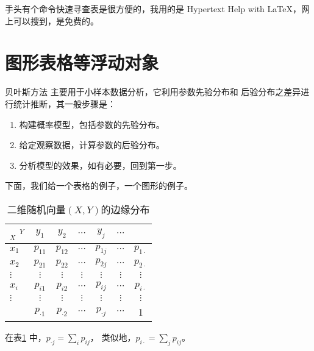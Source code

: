 \documentclass[12pt,a4paper]{article}
\begin{document}
手头有个命令快速寻查表是很方便的，我用的是 Hypertext Help with \LaTeX，网上可以搜到，是免费的。

\section{图形表格等浮动对象}

贝叶斯方法\cite{Gelman} 主要用于小样本数据分析，它利用参数先验分布和
后验分布之差异进行统计推断，其一般步骤是：

\begin{enumerate}
 \item 构建概率模型，包括参数的先验分布。
 \item 给定观察数据，计算参数的后验分布。
 \item 分析模型的效果，如有必要，回到第一步。
\end{enumerate}

\begin{example}
下面，我们给一个表格的例子，一个图形的例子。

\begin{center}
\begin{table}[!ht]     %
\centering
\caption{二维随机向量$(X,Y)$的边缘分布}
\begin{tabular}{l|ccccc|c}
  $_X$\hspace{3mm} $^Y$&$y_1$&$y_2$&$\cdots$&$y_j$&$\cdots$\\
\hline
$x_1$   &$p_{11}$&$p_{12}$&$\cdots$&$p_{1j}$&$\cdots$&$p_{1\cdot}$\\
$x_2$   &$p_{21}$&$p_{22}$&$\cdots$&$p_{2j}$&$\cdots$&$p_{2\cdot}$\\
$\vdots$&$\vdots$&$\vdots$&$\vdots$&$\vdots$&$\vdots$&$\vdots$\\
$x_i$   &$p_{i1}$&$p_{i2}$&$\cdots$&$p_{ij}$&$\cdots$&$p_{i\cdot}$\\
$\vdots$&$\vdots$&$\vdots$&$\vdots$&$\vdots$&$\vdots$&$\vdots$\\
\hline
   &$p_{\cdot 1}$&$p_{\cdot 2}$&$\cdots$&$p_{\cdot j}$&$\cdots$&1
\label{marginal distribution}
\end{tabular}
\end{table}
\end{center}

在表\ref{marginal distribution} 中，$p_{\cdot j}=\sum\limits_i p_{ij}$，
类似地，$ p_{i\cdot}=\sum\limits_j p_{ij}$。
\end{example}

\end{document}
